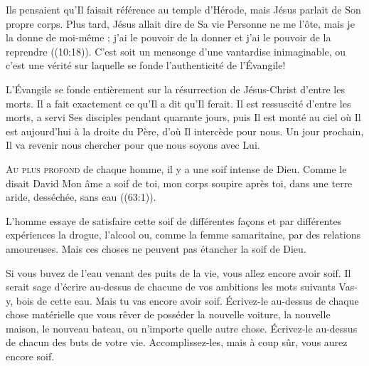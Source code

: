 Ils pensaient qu'Il faisait référence au temple d'Hérode,
 mais Jésus parlait de Son propre corps.
 Plus tard, Jésus allait dire de Sa vie\frcolon{} 
 \Og Personne ne me l'ôte, mais je la donne de moi-même ;
 j'ai le pouvoir de la donner et j'ai le pouvoir de la reprendre \Fg{}
 ((10:18)).
 C'est soit un mensonge d'une vantardise inimaginable,
 ou c'est une vérité sur laquelle se fonde
 l'authenticité de l'Évangile!


L'Évangile se fonde entièrement sur la résurrection
 de Jésus-Christ d'entre les morts.
 Il a fait exactement ce qu'Il a dit qu'Il ferait.
 Il est ressuscité d'entre les morts, a servi Ses disciples
 pendant quarante jours, puis Il est monté au ciel
 où Il est aujourd'hui à la droite du Père,
 d'où Il intercède pour nous.
 Un jour prochain, Il va revenir nous chercher
 pour que nous soyons avec Lui.

\dvrule






\lettrine{A}{u plus profond} de chaque homme,
 il y a une soif intense de Dieu.
 Comme le disait David\frcolon{} 
 \Og Mon âme a soif de toi, mon corps soupire après toi,
 dans une terre aride, desséchée, sans eau \Fg{}
 ((63:1)). 

L'homme essaye de satisfaire cette soif de différentes fa\c{c}ons
 et par différentes expériences \ocadr la drogue, l'alcool ou,
 comme la femme samaritaine, par des relations amoureuses.
 Mais ces choses ne peuvent pas étancher la soif de Dieu.


Si vous buvez de l'eau venant des puits de la vie,
 vous allez encore avoir soif.
 Il serait sage d'écrire au-dessus
 de chacune de vos ambitions les mots suivants\frcolon{}
 \Og Vas-y, bois de cette eau. Mais tu vas encore avoir soif. \Fg{}
 Écrivez-le  au-dessus de chaque chose matérielle
 que vous rêver de posséder \ocadr la nouvelle voiture, la nouvelle maison,
 le nouveau bateau, ou n'importe quelle autre chose.
 Écrivez-le au-dessus de chacun des buts de votre vie.
 Accomplissez-les, mais à coup sûr, vous aurez encore soif.

